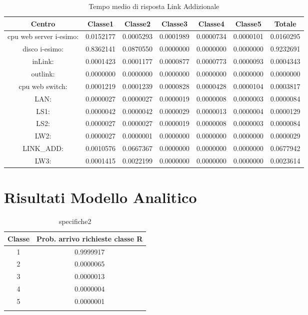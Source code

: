 \begin{table}[H]
\begin{center}\begin{scriptsize}
\begin{tabular}{||c|c|c|c|c|c|c||}
\hline
Centro &Classe1 &Classe2 &Classe3 &Classe4 &Classe5 &Totale\\
\hline
\hline
 cpu web server i-esimo: 	&0.0152177	&0.0005293	&0.0001989	&0.0000734	&0.0000101	&0.0160295\\
\hline
 disco i-esimo: 	&0.8362141	&0.0870550	&0.0000000	&0.0000000	&0.0000000	&0.9232691\\
\hline
 inLink: 	&0.0001423	&0.0001177	&0.0000877	&0.0000773	&0.0000093	&0.0004343\\
\hline
 outlink: 	&0.0000000	&0.0000000	&0.0000000	&0.0000000	&0.0000000	&0.0000000\\
\hline
 cpu web switch: 	&0.0001219	&0.0001239	&0.0000828	&0.0000428	&0.0000104	&0.0003817\\
\hline
 LAN: 	&0.0000027	&0.0000027	&0.0000019	&0.0000008	&0.0000003	&0.0000084\\
\hline
 LS1: 	&0.0000042	&0.0000042	&0.0000029	&0.0000013	&0.0000004	&0.0000129\\
\hline
 LS2: 	&0.0000027	&0.0000027	&0.0000019	&0.0000008	&0.0000003	&0.0000084\\
\hline
 LW2: 	&0.0000027	&0.0000001	&0.0000000	&0.0000000	&0.0000000	&0.0000029\\
\hline
 LINK\_ADD: 	&0.0010576	&0.0667367	&0.0000000	&0.0000000	&0.0000000	&0.0677942\\
\hline
 LW3: 	&0.0001415	&0.0022199	&0.0000000	&0.0000000	&0.0000000	&0.0023614\\
\hline
\end{tabular}
\end{scriptsize}\end{center}
\caption{Tempo medio di risposta Link Addizionale}
\label{tempomediodirisposta}
\end{table}

\section{Risultati Modello Analitico}

\begin{table}[H]
\begin{center}
\begin{tabular}{||c|c||}
\hline
Classe		&Prob. arrivo richieste classe R	\\
\hline
\hline
1		&0.9999917\\
\hline
2		&0.0000065\\
\hline
3		&0.0000013\\
\hline
4		&0.0000004\\
\hline
5		&0.0000001\\
\hline 	\\
\end{tabular}
\end{center}
\caption{specifiche2}
\label{test_2}
\end{table}


